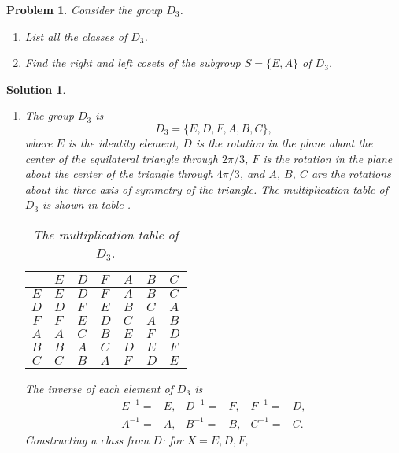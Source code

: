 \documentclass[UTF8,10pt,a4paper]{article}
\theoremstyle{Problem}
\newtheorem{prob}{Problem}
\theoremstyle{Solution}
\newtheorem*{sol}{Solution}
\begin{document}
\begin{prob}
    Consider the group $D_3$.
    \begin{enumerate}
        \item[(a)] List all the classes of $D_3$.
        \item[(b)] Find the right and left cosets of the subgroup $S=\{E,A\}$ of $D_3$.
    \end{enumerate}
\end{prob}
\begin{sol}
    \begin{enumerate}
        \item[(a)] The group $D_3$ is
        \begin{equation}
            D_3=\{E,D,F,A,B,C\},
        \end{equation}
        where $E$ is the identity element, $D$ is the rotation in the plane about the center of the equilateral triangle through $2\pi/3$, $F$ is the rotation in the plane about the center of the triangle through $4\pi/3$, and $A$, $B$, $C$ are the rotations about the three axis of symmetry of the triangle. The multiplication table of $D_3$ is shown in table .
        \begin{table}[h]
            \centering
            \caption{The multiplication table of $D_3$.}
            \label{3-D3-MT}
            \begin{tabular}{c|llllll}
             & $E$ & $D$ & $F$ & $A$ & $B$ & $C$ \\ \hline
            $E$ & $E$ & $D$ & $F$ & $A$ & $B$ & $C$ \\
            $D$ & $D$ & $F$ & $E$ & $B$ & $C$ & $A$ \\
            $F$ & $F$ & $E$ & $D$ & $C$ & $A$ & $B$ \\
            $A$ & $A$ & $C$ & $B$ & $E$ & $F$ & $D$ \\
            $B$ & $B$ & $A$ & $C$ & $D$ & $E$ & $F$ \\
            $C$ & $C$ & $B$ & $A$ & $F$ & $D$ & $E$
            \end{tabular}
            \end{table}
        The inverse of each element of $D_3$ is
        \begin{align*}
            E^{-1}=&E,&D^{-1}=&F,&F^{-1}=&D,\\
            A^{-1}=&A,&B^{-1}=&B,&C^{-1}=&C.
        \end{align*}
        Constructing a class from $D$: for $X=E,D,F$,
        \begin{equation}

\end{equation}
\end{enumerate}
\end{sol}
\end{document}
